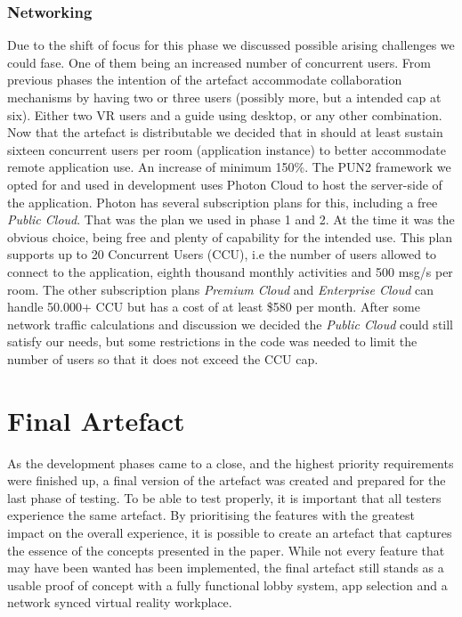 \subsubsection{Networking}
Due to the shift of focus for this phase we discussed possible arising challenges we could fase. One of them being an increased number of concurrent users. From previous phases the intention of the artefact accommodate collaboration mechanisms by having two or three users (possibly more, but a intended cap at six). Either two VR users and a guide using desktop, or any other combination. Now that the artefact is distributable we decided that in should at least sustain sixteen concurrent users per room (application instance) to better accommodate remote application use. An increase of minimum 150\%. 
The PUN2 framework we opted for and used in development uses Photon Cloud to host the server-side of the application. Photon has several subscription plans for this, including a free \textit{Public Cloud}. That was the plan we used in phase 1 and 2. At the time it was the obvious choice, being free and plenty of capability for the intended use. This plan supports up to 20 Concurrent Users (CCU), i.e the number of users allowed to connect to the application, eighth thousand monthly activities and 500 msg/s per room. The other subscription plans \textit{Premium Cloud} and \textit{Enterprise Cloud} can handle 50.000+ CCU but has a cost of at least \$580 per month. After some network traffic calculations and discussion we decided the \textit{Public Cloud} could still satisfy our needs, but some restrictions in the code was needed to limit the number of users so that it does not exceed the CCU cap. 








\section{Final Artefact}
As the development phases came to a close, and the highest priority requirements were finished up, a final version of the artefact was created and prepared for the last phase of testing. To be able to test properly, it is important that all testers experience the same artefact. By prioritising the features with the greatest impact on the overall experience, it is possible to create an artefact that captures the essence of the concepts presented in the paper. While not every feature that may have been wanted has been implemented, the final artefact still stands as a usable proof of concept with a fully functional lobby system, app selection and a network synced virtual reality workplace.


